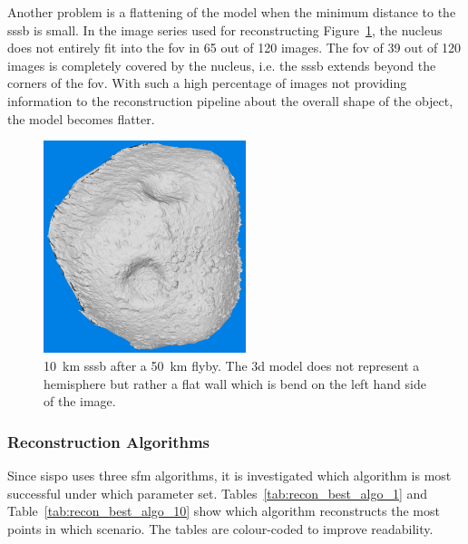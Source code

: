 Another problem is a flattening of the model when the minimum distance to the \gls{sssb} is small. In the image series used for reconstructing Figure~\ref{fig:model_flat}, the nucleus does not entirely fit into the \gls{fov} in \SI{65}{} out of \SI{120}{} images. The \gls{fov} of \SI{39}{} out of \SI{120}{} images is completely covered by the nucleus, i.e. the \gls{sssb} extends beyond the corners of the \gls{fov}. With such a high percentage of images not providing information to the reconstruction pipeline about the overall shape of the object, the model becomes flatter.

\begin{figure}[htb]
    \centering
    \includegraphics[width=\textwidth,height=6.2cm]{doc/thesis/0_figures/models_quality/50_10/120_50_10_refine1.png}
    \caption{\SI{10}{\kilo\meter} \gls{sssb} after a \SI{50}{\kilo\meter} flyby. The \gls{3d} model does not represent a hemisphere but rather a flat wall which is bend on the left hand side of the image.}
    \label{fig:model_flat}
\end{figure}



\subsubsection{Reconstruction Algorithms}
Since \gls{sispo} uses three \gls{sfm} algorithms, it is investigated which algorithm is most successful under which parameter set. Tables~\ref{tab:recon_best_algo_1} and Table~\ref{tab:recon_best_algo_10} show which algorithm reconstructs the most points in which scenario. The tables are colour-coded to improve readability.

